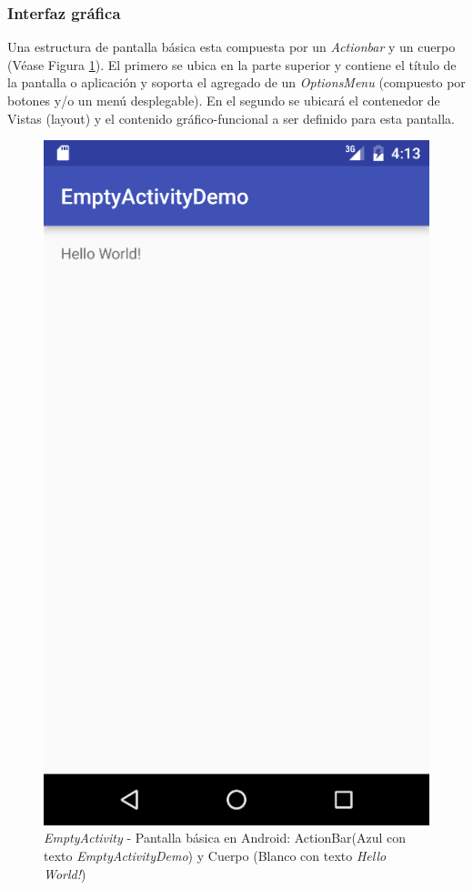     \subsubsection{Interfaz gráfica}
    
    \par Una estructura de pantalla básica esta compuesta por un \textit{Actionbar} y un cuerpo (Véase Figura \ref{fig:emptyActivity}). El primero se ubica en la parte superior  y contiene el título de la pantalla o aplicación y soporta el agregado de un \textit{OptionsMenu} (compuesto por botones y/o un menú desplegable). En el segundo se ubicará el contenedor de Vistas (layout) y el contenido gráfico-funcional a ser definido para esta pantalla.
    
    \begin{figure}
        \centering
        \includegraphics[scale=0.5]{software/EmptyActivity.jpg}
        \caption{\textit{EmptyActivity} - Pantalla básica en Android: ActionBar(Azul con texto \textit{EmptyActivityDemo}) y Cuerpo (Blanco con texto \textit{Hello World!})}
        \label{fig:emptyActivity}
    \end{figure}
    
